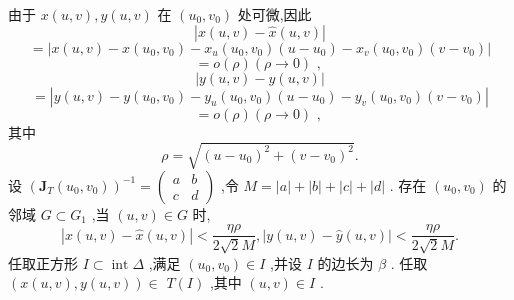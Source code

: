 由于 \(x\left( {u,v}\right) ,y\left( {u,v}\right)\) 在 \(\left( {{u}_{0},{v}_{0}}\right)\) 处可微,因此
\[
\left| {x\left( {u,v}\right)  - \widehat{x}\left( {u,v}\right) }\right|
\]
\[
= \left| {x\left( {u,v}\right)  - x\left( {{u}_{0},{v}_{0}}\right)  - {x}_{u}\left( {{u}_{0},{v}_{0}}\right) \left( {u - {u}_{0}}\right)  - {x}_{v}\left( {{u}_{0},{v}_{0}}\right) \left( {v - {v}_{0}}\right) }\right|
\]
\[
= o\left( \rho \right) \left( {\rho  \rightarrow  0}\right) \text{ , }
\]
\[
\left| {y\left( {u,v}\right)  - \widehat{y}\left( {u,v}\right) }\right|
\]
\[
= \left| {y\left( {u,v}\right)  - y\left( {{u}_{0},{v}_{0}}\right)  - {y}_{u}\left( {{u}_{0},{v}_{0}}\right) \left( {u - {u}_{0}}\right)  - {y}_{v}\left( {{u}_{0},{v}_{0}}\right) \left( {v - {v}_{0}}\right) }\right|
\]
\[
= o\left( \rho \right) \left( {\rho  \rightarrow  0}\right) \text{ , }
\]
其中
\[
\rho  = \sqrt{{\left( u - {u}_{0}\right) }^{2} + {\left( v - {v}_{0}\right) }^{2}}.
\]
设 \({\left( {\mathbf{J}}_{T}\left( {u}_{0},{v}_{0}\right) \right) }^{-1} = \left( \begin{array}{ll} a & b \\  c & d \end{array}\right)\) ,令 \(M = \left| a\right|  + \left| b\right|  + \left| c\right|  + \left| d\right|\) . 存在 \(\left( {{u}_{0},{v}_{0}}\right)\) 的邻域 \(G \subset  {G}_{1}\) ,当 \(\left( {u,v}\right)  \in  G\) 时,
\[
\left| {x\left( {u,v}\right)  - \widehat{x}\left( {u,v}\right) }\right|  < \frac{\eta \rho }{2\sqrt{2}M},\left| {y\left( {u,v}\right)  - \widehat{y}\left( {u,v}\right) }\right|  < \frac{\eta \rho }{2\sqrt{2}M}.
\]
任取正方形 \(I \subset  \operatorname{int}\Delta\) ,满足 \(\left( {{u}_{0},{v}_{0}}\right)  \in  I\) ,并设 \(I\) 的边长为 \(\beta\) . 任取 \(\left( {x\left( {u,v}\right) ,y\left( {u,v}\right) }\right)  \in\)  \(T\left( I\right)\) ,其中 \(\left( {u,v}\right)  \in  I\) .

